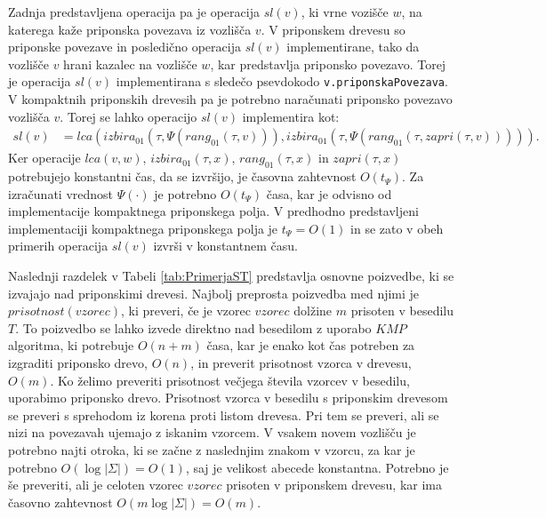 Zadnja predstavljena operacija pa je operacija $sl(v)$, ki vrne vozišče $w$, na katerega kaže priponska povezava iz vozlišča $v$. V priponskem drevesu so priponske povezave in posledično operacija $sl(v)$ implementirane, tako da vozlišče $v$ hrani kazalec na vozlišče $w$, kar predstavlja priponsko povezavo. Torej je operacija $sl(v)$ implementirana s sledečo psevdokodo \verb|v.priponskaPovezava|. V kompaktnih priponskih drevesih pa je potrebno naračunati priponsko povezavo vozlišča $v$. Torej se lahko operacijo $sl(v)$ implementira kot:
\begin{equation*}
\begin{split}
    sl(v)&=lca(izbira_{01}(\tau,\Psi(rang_{01}(\tau,v))),izbira_{01}(\tau,\Psi(rang_{01}(\tau,zapri(\tau,v))))).
\end{split}   
\end{equation*}
Ker operacije $lca(v,w)$, $izbira_{01}(\tau,x)$, $rang_{01}(\tau,x)$ in $zapri(\tau,x)$ potrebujejo konstantni čas, da se izvršijo, je časovna zahtevnost $O(t_\Psi)$. Za izračunati vrednost $\Psi(\cdot)$ je potrebno $O(t_\Psi)$ časa, kar je odvisno od implementacije kompaktnega priponskega polja. V predhodno predstavljeni implementaciji kompaktnega priponskega polja je $t_\Psi=O(1)$ in se zato v obeh primerih operacija $sl(v)$ izvrši v konstantnem času.

Naslednji razdelek v Tabeli \ref{tab:PrimerjaST} predstavlja osnovne poizvedbe, ki se izvajajo nad priponskimi drevesi. Najbolj preprosta poizvedba med njimi je $prisotnost(vzorec)$, ki preveri, če je vzorec $vzorec$ dolžine $m$ prisoten v besedilu $T$. To poizvedbo se lahko izvede direktno nad besedilom z uporabo $KMP$ algoritma, ki potrebuje $O(n+m)$ časa, kar je enako kot čas potreben za izgraditi priponsko drevo, $O(n)$, in preverit prisotnost vzorca v drevesu, $O(m)$. Ko želimo preveriti prisotnost večjega števila vzorcev v besedilu, uporabimo priponsko drevo. Prisotnost vzorca v besedilu s priponskim drevesom se preveri s sprehodom iz korena proti listom drevesa. Pri tem se preveri, ali se nizi na povezavah ujemajo z iskanim vzorcem. V vsakem novem vozlišču je potrebno najti otroka, ki se začne z naslednjim znakom v vzorcu, za kar je potrebno $O(\log|\Sigma|)=O(1)$, saj je velikost abecede konstantna. Potrebno je še preveriti, ali je celoten vzorec $vzorec$ prisoten v priponskem drevesu, kar ima časovno zahtevnost $O(m\log|\Sigma|)=O(m)$. 

